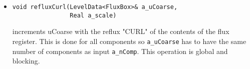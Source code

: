\begin{itemize}
\item
\begin{verbatim}
void refluxCurl(LevelData<FluxBox>& a_uCoarse,
                Real a_scale)
\end{verbatim}
increments uCoarse with the reflux "CURL" of the
contents of the flux register. This is done for all components so
\verb/a_uCoarse/ has to have the same number of components as input
\verb/a_nComp/. This operation is global and blocking.

\end{itemize}
